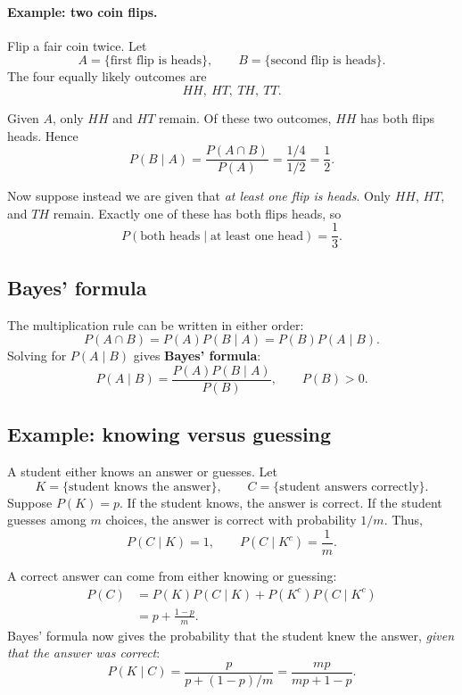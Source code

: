 \documentclass[11pt]{article}
\begin{document}
\paragraph{Example: two coin flips.}
Flip a fair coin twice. Let
\[
A=\{\text{first flip is heads}\},\qquad
B=\{\text{second flip is heads}\}.
\]
The four equally likely outcomes are
\[
HH,\ HT,\ TH,\ TT.
\]

Given $A$, only $HH$ and $HT$ remain. Of these two outcomes,
$HH$ has both flips heads. Hence
\[
P(B\mid A)
=\frac{P(A\cap B)}{P(A)}
=\frac{1/4}{1/2}
=\boxed{\frac12}.
\]

Now suppose instead we are given that \emph{at least one flip is
heads}. Only $HH$, $HT$, and $TH$ remain. Exactly one of these
has both flips heads, so
\[
\boxed{
P(\text{both heads}\mid\text{at least one head})=\frac13.
}
\]

\subsection{Bayes' formula}

The multiplication rule can be written in either order:
\[
P(A\cap B)=P(A)P(B\mid A)=P(B)P(A\mid B).
\]
Solving for $P(A\mid B)$ gives \textbf{Bayes' formula}:
\[
\boxed{
P(A\mid B)=\frac{P(A)P(B\mid A)}{P(B)},
\qquad P(B)>0.
}
\]

\subsection{Example: knowing versus guessing}

A student either knows an answer or guesses. Let
\[
K=\{\text{student knows the answer}\},\qquad
C=\{\text{student answers correctly}\}.
\]
Suppose $P(K)=p$. If the student knows, the answer is correct.
If the student guesses among $m$ choices, the answer is correct
with probability $1/m$. Thus,
\[
P(C\mid K)=1,\qquad
P(C\mid K^c)=\frac1m.
\]

A correct answer can come from either knowing or guessing:
\[
\begin{aligned}
P(C)
&=P(K)P(C\mid K)
 +P(K^c)P(C\mid K^c)\\
&=p+\frac{1-p}{m}.
\end{aligned}
\]
Bayes' formula now gives the probability that the student knew
the answer, \emph{given that the answer was correct}:
\[
\boxed{
P(K\mid C)
=
\frac{p}{p+(1-p)/m}
=
\frac{mp}{mp+1-p}.
}
\]
\end{document}

